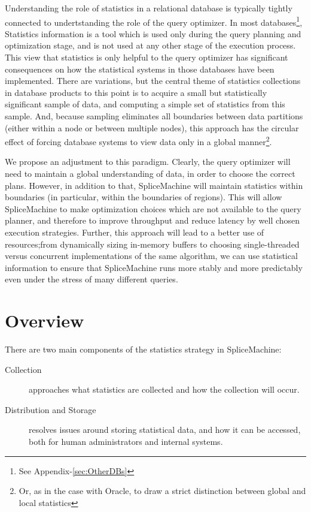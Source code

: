 Understanding the role of statistics in a relational database is typically tightly connected to undertstanding the role of the query optimizer. In most databases\footnote{See Appendix-\ref{sec:OtherDBs}}, Statistics information is a tool which is used only during the query planning and optimization stage, and is not used at any other stage of the execution process. This view that statistics is only helpful to the query optimizer has significant consequences on how the statistical systems in those databases have been implemented. There are variations, but the central theme of statistics collections in database products to this point is to acquire a small but statistically significant sample of data, and computing a simple set of statistics from this sample. And, because sampling eliminates all boundaries between data partitions (either within a node or between multiple nodes), this approach has the circular effect of forcing database systems to view data only in a global manner\footnote{Or, as in the case with Oracle, to draw a strict distinction between global and local statistics}.

We propose an adjustment to this paradigm. Clearly, the query optimizer will need to maintain a global understanding of data, in order to choose the correct plans. However, in addition to that, SpliceMachine will maintain statistics within boundaries (in particular, within the boundaries of regions). This will allow SpliceMachine to make optimization choices which are not available to the query planner, and therefore to improve throughput and reduce latency by well chosen execution strategies. Further, this approach will lead to a better use of resources;from dynamically sizing in-memory buffers to choosing single-threaded versus concurrent implementations of the same algorithm, we can use statistical information to ensure that SpliceMachine runs more stably and more predictably even under the stress of many different queries.

\section{Overview}
There are two main components of the statistics strategy in SpliceMachine:

\begin{description}
\item[Collection] approaches what statistics are collected and how the collection will occur.
\item[Distribution and Storage] resolves issues around storing statistical data, and how it can be accessed, both for human administrators and internal systems.
\end{description}

